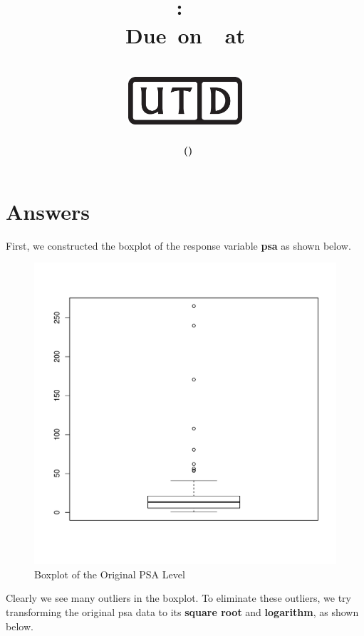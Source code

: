 \documentclass[12pt,letterpaper,titlepage,en-US]{article}
\title{
    \vspace{1in}
    \textmd{\textbf{\hmwkClassName \\\hmwkClass:\ \hmwkTitle }}\\
    \normalsize\vspace{0.1in}\small{Due\ on\ \DTMusedate{DueDate}\ at \DTMusetime{DueDate} }\\
    \vspace{0.1in}\large{\textit{\hmwkClassInstructor}}\\
    \vspace{0.5in}\includegraphics[height=2.4em]{UTD_logo_BW}\\
    \vspace{2in}
}
\author{\textbf{\hmwkAuthorName\ \footnotesize{(\hmwkAuthorNetID)}} \\ }
\date{}
\begin{document}
\maketitle

\tableofcontents
\pagebreak
{}


\section{Answers}
First, we constructed the boxplot of the response variable \textbf{psa} as shown below.

\begin{figure}[H]
    \centering
    \caption{Boxplot of the Original PSA Level}\label{obp}
    \includegraphics[width=.7\textwidth]{fig/boxplotpsa.pdf}
\end{figure}

Clearly we see many outliers in the boxplot.
To eliminate these outliers, we try transforming the original psa data to
its \textbf{square root} and \textbf{logarithm}, as shown below.
\end{document}
